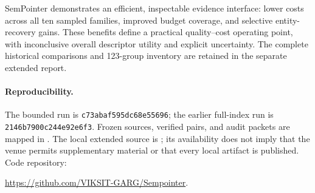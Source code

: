 \documentclass[runningheads]{llncs}
\begin{document}
SemPointer demonstrates an efficient, inspectable evidence interface: lower costs across all ten sampled families, improved budget coverage, and selective entity-recovery gains. These benefits define a practical quality--cost operating point, with inconclusive overall descriptor utility and explicit uncertainty. The complete historical comparisons and 123-group inventory are retained in the separate extended report.

\paragraph{Reproducibility.}
The bounded run is \texttt{c73abaf595dc68e55696}; the earlier full-index run is \texttt{2146b7900c244e92e6f3}. Frozen sources, verified pairs, and audit packets are mapped in . The local extended source is ; its availability does not imply that the venue permits supplementary material or that every local artifact is published. Code repository:
\begin{center}\url{https://github.com/VIKSIT-GARG/Sempointer}.\end{center}



\end{document}
